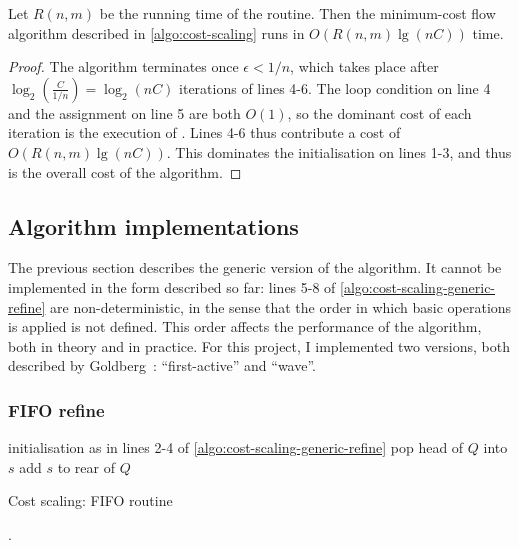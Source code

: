 \begin{thm}  \label{lemma:cost-scaling-overall-algorithm}
Let $R(n,m)$ be the running time of the  routine. Then the minimum-cost flow algorithm described in \cref{algo:cost-scaling} runs in $O\left(R(n,m)\lg(nC)\right)$ time.
\end{thm}
\begin{proof}
The algorithm terminates once $\epsilon < 1/n$, which takes place after $\log_2\left(\frac{C}{1/n}\right) = \log_2 (nC)$ iterations of lines 4-6. The loop condition on line 4 and the assignment on line 5 are both $O(1)$, so the dominant cost of each iteration is the execution of . Lines 4-6 thus contribute a cost of $O\left(R(n,m)\lg(nC)\right)$. This dominates the initialisation on lines 1-3, and thus is the overall cost of the algorithm.
\end{proof}

\subsection{Algorithm implementations} \label{sec:impl-cost-scaling-implementations}

The previous section describes the generic version of the algorithm. It cannot be implemented in the form described so far: lines 5-8 of \cref{algo:cost-scaling-generic-refine} are non-deterministic, in the sense that the order in which basic operations is applied is not defined. This order affects the performance of the algorithm, both in theory and in practice. For this project, I implemented two versions, both described by Goldberg~\cite{Goldberg:1990}: ``first-active'' and ``wave''.

\subsubsection{FIFO refine}

\begin{algorithm}
\begin{algorithmic}[1]
        \State initialisation as in lines 2-4 of \cref{algo:cost-scaling-generic-refine}
         
            \State pop head of $Q$ into $s$
            \State {} 
                \State add $s$ to rear of $Q$
                \Break
            \EndIf
        \EndWhile
    \EndFunction
\end{algorithmic}
\caption{Cost scaling: FIFO  routine}.
\label{algo:cost-scaling-first-active-refine}
\end{algorithm}

